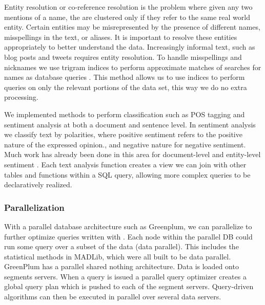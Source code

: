 Entity resolution or co-reference resolution is the problem where given any two
mentions of a name, the are clustered only if they refer to the same real 
world entity. 
Certain entities may be misrepresented by the presence of different names, 
misspellings in the text, or aliases. It is important to
resolve these entities appropriately to better understand the data. Increasingly
informal text, such as blog posts and tweets requires entity resolution. 
To handle misspellings and nicknames we use trigram indices to perform 
approximate matches of searches for names as database queries 
\cite{Jain:2009:BQO:1519103.1519108}. 
This method allows us to use indices to perform queries on only the relevant
portions of the data set, this way we do no extra processing.

We implemented methods to perform classification such as POS tagging and 
sentiment analysis at both a document and sentence level.
In sentiment analysis we classify text by polarities, where positive
sentiment refers to the positive nature of the expressed opinion., and negative
nature for negative sentiment. Much work has already been done in this
area for document-level and entity-level sentiment \cite{o2010tweets,
zhang2011combining}. 
Each text analysis function creates a view we can join with other tables
and functions within a SQL query, allowing more complex queries to be 
declaratively realized. 


\subsubsection*{Parallelization}
With a parallel database architecture such as 
Greenplum, we can parallelize to further optimize queries written
with {\system}. Each node within the parallel DB could run some query
over a subset of the data (data parallel). This includes the statistical methods
in MADLib, which were all built to be data parallel.
GreenPlum has a parallel shared nothing architecture. Data is loaded onto 
segments servers. When a query is issued a parallel query optimizer 
creates a global query plan which is pushed to each of the segment servers.
Query-driven algorithms can then be executed in parallel over several
data servers.



